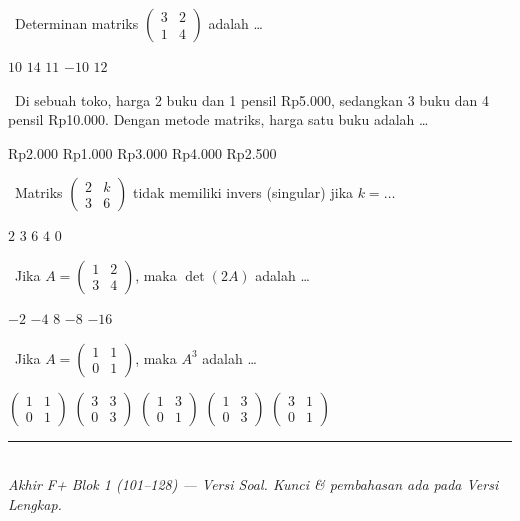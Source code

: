 \documentclass[11pt,a4paper]{exam}
\newcommand{\Inter}{{\footnotesize\textsf{\textcolor{biru}{[Intermediate]}}}\ }
\newcommand{\Adv}{{\footnotesize\textsf{\textcolor{oranye}{[Advanced]}}}\ }
\newcommand{\Exp}{{\footnotesize\textsf{\textcolor{ungu}{[Expert]}}}\ }
\begin{document}
\begin{questions}
\question \Inter Determinan matriks $\begin{pmatrix} 3 & 2\\ 1 & 4 \end{pmatrix}$ adalah \dots
\begin{choices}
\CorrectChoice $10$ \choice $14$ \choice $11$ \choice $-10$ \choice $12$
\end{choices}

\question \Adv Di sebuah toko, harga 2 buku dan 1 pensil Rp5.000, sedangkan 3 buku
dan 4 pensil Rp10.000. Dengan metode matriks, harga satu buku adalah \dots
\begin{choices}
\CorrectChoice Rp2.000 \choice Rp1.000 \choice Rp3.000 \choice Rp4.000 \choice Rp2.500
\end{choices}

\question \Adv Matriks $\begin{pmatrix} 2 & k\\ 3 & 6 \end{pmatrix}$ tidak memiliki
invers (singular) jika $k = \dots$
\begin{choices}
\choice $2$ \choice $3$ \choice $6$ \CorrectChoice $4$ \choice $0$
\end{choices}

\question \Adv Jika $A = \begin{pmatrix} 1 & 2\\ 3 & 4 \end{pmatrix}$, maka $\det(2A)$ adalah \dots
\begin{choices}
\choice $-2$ \choice $-4$ \choice $8$ \CorrectChoice $-8$ \choice $-16$
\end{choices}

\question \Exp Jika $A = \begin{pmatrix} 1 & 1\\ 0 & 1 \end{pmatrix}$, maka $A^{3}$ adalah \dots
\begin{choices}
\choice $\begin{pmatrix} 1 & 1\\ 0 & 1 \end{pmatrix}$
\choice $\begin{pmatrix} 3 & 3\\ 0 & 3 \end{pmatrix}$
\CorrectChoice $\begin{pmatrix} 1 & 3\\ 0 & 1 \end{pmatrix}$
\choice $\begin{pmatrix} 1 & 3\\ 0 & 3 \end{pmatrix}$
\choice $\begin{pmatrix} 3 & 1\\ 0 & 1 \end{pmatrix}$
\end{choices}

\end{questions}

\vspace{6pt}
\begin{center}
{\color{biru}\rule{\linewidth}{1pt}}\\[3pt]
{\small\textit{Akhir F+ Blok 1 (101–128) — Versi Soal. Kunci \& pembahasan ada pada Versi Lengkap.}}
\end{center}
\end{document}
